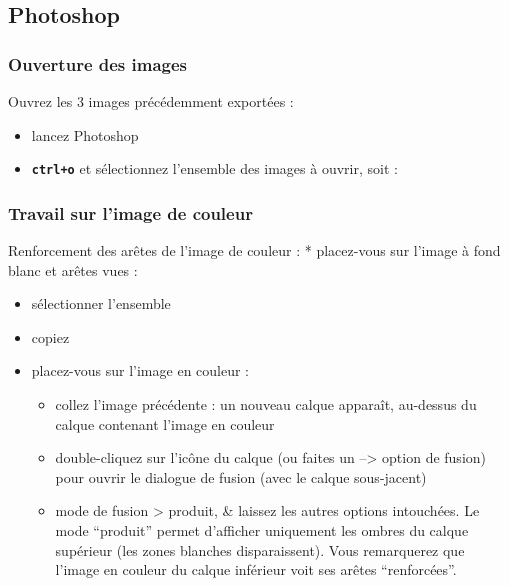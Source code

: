 \documentclass[a4paper,12pt,french]{sphinxmanual}
\begin{document}
\subsection{Photoshop}
\label{psd/prepa-image_su+psd:photoshop}

\subsubsection{Ouverture des images}
\label{psd/prepa-image_su+psd:ouverture-des-images}
Ouvrez les 3 images précédemment exportées :
\begin{itemize}
\item {} 
lancez Photoshop

\item {} 
\textbf{\texttt{ctrl+o}} et sélectionnez l'ensemble des images à ouvrir, soit :

\end{itemize}

\noindent{}


\subsubsection{Travail sur l'image de couleur}
\label{psd/prepa-image_su+psd:travail-sur-l-image-de-couleur}
\noindent{}

Renforcement des arêtes de l'image de couleur :
* placez-vous sur l'image à fond blanc et arêtes vues :
\begin{itemize}
\item {} 
sélectionner l'ensemble 

\item {} 
copiez 

\end{itemize}
\begin{itemize}
\item {} 
placez-vous sur l'image en couleur :
\begin{itemize}
\item {} 
collez l'image précédente  : un nouveau calque apparaît, au-dessus du calque contenant l'image en couleur

\item {} 
double-cliquez sur l'icône du calque (ou faites un  --\textgreater{} option de fusion) pour ouvrir le dialogue de fusion (avec le calque sous-jacent)

\item {} 
mode de fusion \textgreater{} produit, \& laissez les autres options intouchées. Le mode ``produit'' permet d'afficher uniquement les ombres du calque supérieur (les zones blanches disparaissent). Vous remarquerez que l'image en couleur du calque inférieur voit ses arêtes ``renforcées''.

\end{itemize}

\end{itemize}
\end{document}
